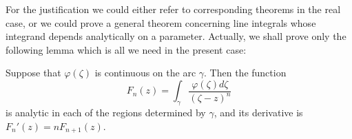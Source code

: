 For the justification we could either refer to corresponding theorems in the real case, or we could prove a general theorem concerning line integrals whose integrand depends analytically on a parameter. Actually, we shall prove only the following lemma which is all we need in the present case:
\begin{lemma}
Suppose that $\varphi(\zeta)$ is continuous on the arc $\gamma$. Then the function $$F_n(z)=\int_{\gamma}\dfrac{\varphi(\zeta)d\zeta}{(\zeta-z)^n}$$ is analytic in each of the regions determined by $\gamma$, and its derivative is $F_n'(z)=nF_{n+1}(z)$.
\end{lemma}